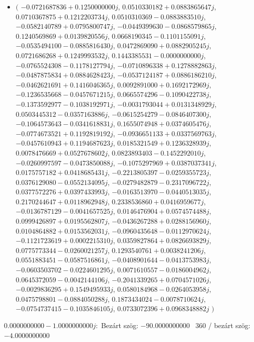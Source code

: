 \documentclass[14pt,a4paper]{article}
\begin{document}
\begin{itemize}
\item
$\big($
$-0.0721687836+0.1250000000j$, $0.0510330182+0.0883865647j$, $0.0710367875+0.1212203734j$, $0.0510310369-0.0883883510j$, $-0.0582140789+0.0795800747j$, $-0.0449399630-0.0868579865j$, $0.1240569869+0.0139820556j$, $0.0668190345-0.1101155091j$, $-0.0535494100-0.0885816430j$, $0.0472869090+0.0882905245j$, $0.0721686268+0.1249993532j$, $0.1443385531-0.0000000000j$, $-0.0765524308-0.1178127794j$, $-0.0710896338+0.1278882863j$, $-0.0487875834+0.0884628423j$, $-0.0537124187+0.0886186210j$, $-0.0462621691+0.1416046365j$, $0.0092891000+0.1692172969j$, $-0.1236535668-0.0457671215j$, $0.0665574296-0.1090422738j$, $-0.1373592977-0.1038192971j$, $-0.0031793044+0.0131348929j$, $0.0503445312-0.0357163886j$, $-0.0615254279-0.0846407300j$, $-0.1064573643-0.0341618831j$, $0.1655074948+0.0374605476j$, $-0.0774673521+0.1192819192j$, $-0.0936651133+0.0337569763j$, $-0.0457610943+0.1194687623j$, $0.0185321549+0.1236328939j$, $0.0078476669+0.0527678602j$, $0.0823893403-0.1452292010j$, $-0.0260997597-0.0473850088j$, $-0.1075297969+0.0387037341j$, $0.0175757182+0.0418685431j$, $-0.2213805397-0.0259355723j$, $0.0376129080-0.0552134095j$, $-0.0279482879-0.2317096722j$, $0.0377572276+0.0397433993j$, $-0.0163513970-0.0440513035j$, $0.2170244647+0.0118962948j$, $0.2338536860+0.0416959677j$, $-0.0136787129-0.0041657525j$, $0.0146476904+0.0574574488j$, $0.0999426897+0.0195562807j$, $-0.0436267288+0.0288156960j$, $0.0104864882+0.0153562031j$, $-0.0960435648-0.0112970624j$, $-0.1121723619+0.0002215310j$, $0.0359827864+0.0826693829j$, $0.0775773344-0.0260021257j$, $0.1293540761+0.0038241206j$, $0.0551883451-0.0587516861j$, $-0.0408901644-0.0413753983j$, $-0.0603503702-0.0224601295j$, $0.0071610557-0.0186004962j$, $0.0645372059-0.0042144106j$, $-0.2041339265+0.0704571026j$, $-0.0029836295+0.1549495933j$, $0.0580184968-0.0264053958j$, $0.0475798801-0.0884050288j$, $0.1873434024-0.0078710624j$, $-0.0754737415-0.1035846105j$, $0.0733072396+0.0968348882j$
$\big)$
\end{itemize}
$0.0000000000-1.0000000000j$:\
Bezárt szög: $-90.0000000000$ \
360 / bezárt szög: $-4.0000000000$\
\end{document}
